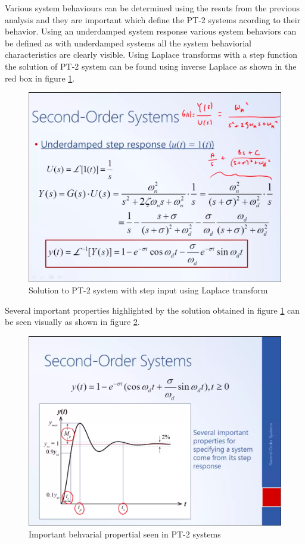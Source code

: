 Various system behaviours can be determined using the resuts from the previous analysis and they are important which define the PT-2 systems acording to their behavior. Using an underdamped system response various system behaviors can be defined as with underdamped systems all the system behaviorial characteristics are clearly visible. Using Laplace transforms with a step function the solution of PT-2 system can be found using inverse Laplace as shown in the red box in figure \ref{Fig_Sol_PT2_StepInput_Laplace}.
\begin{figure}[h!]
	\centering
	\includegraphics[width=\linewidth]{Bilder/Sol_PT2}
	\caption{Solution to PT-2 system with step input using Laplace transform}
	\label{Fig_Sol_PT2_StepInput_Laplace}
\end{figure}
Several important properties highlighted by the solution obtained in figure \ref{Fig_Sol_PT2_StepInput_Laplace} can be seen visually as shown in figure \ref{Fig_Prop_PT2_Laplace}.
\clearpage
\begin{figure}[h!]
	\centering
	\includegraphics[width=\linewidth]{Bilder/Prop_PT2}
	\caption{Important behvarial propertial seen in PT-2 systems}
	\label{Fig_Prop_PT2_Laplace}
\end{figure}
